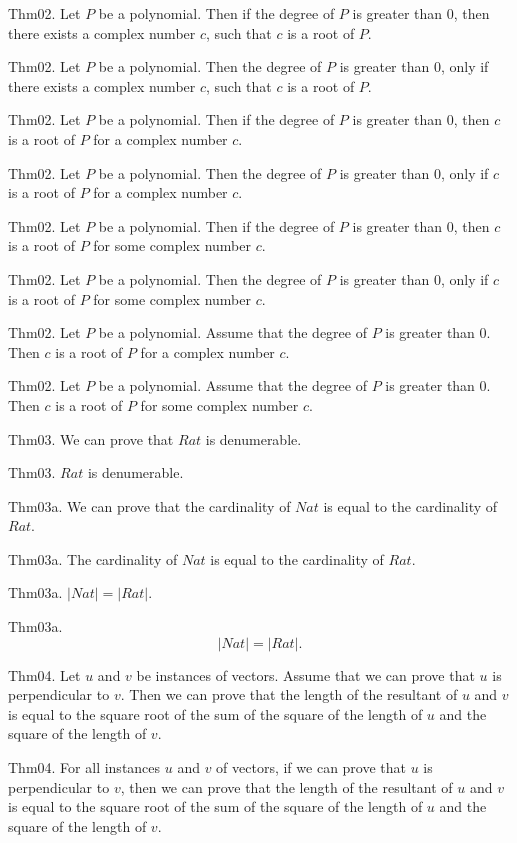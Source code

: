 \documentclass{article}
\begin{document}
Thm02. Let $P$ be a polynomial. Then if the degree of $P$ is greater than $0$, then there exists a complex number $c$, such that $c$ is a root of $P$.

Thm02. Let $P$ be a polynomial. Then the degree of $P$ is greater than $0$, only if there exists a complex number $c$, such that $c$ is a root of $P$.

Thm02. Let $P$ be a polynomial. Then if the degree of $P$ is greater than $0$, then $c$ is a root of $P$ for a complex number $c$.

Thm02. Let $P$ be a polynomial. Then the degree of $P$ is greater than $0$, only if $c$ is a root of $P$ for a complex number $c$.

Thm02. Let $P$ be a polynomial. Then if the degree of $P$ is greater than $0$, then $c$ is a root of $P$ for some complex number $c$.

Thm02. Let $P$ be a polynomial. Then the degree of $P$ is greater than $0$, only if $c$ is a root of $P$ for some complex number $c$.

Thm02. Let $P$ be a polynomial. Assume that the degree of $P$ is greater than $0$. Then $c$ is a root of $P$ for a complex number $c$.

Thm02. Let $P$ be a polynomial. Assume that the degree of $P$ is greater than $0$. Then $c$ is a root of $P$ for some complex number $c$.

Thm03. We can prove that $Rat$ is denumerable.

Thm03. $Rat$ is denumerable.

Thm03a. We can prove that the cardinality of $Nat$ is equal to the cardinality of $Rat$.

Thm03a. The cardinality of $Nat$ is equal to the cardinality of $Rat$.

Thm03a. $| Nat | = | Rat |$.

Thm03a. $$| Nat | = | Rat |.$$

Thm04. Let $u$ and $v$ be instances of vectors. Assume that we can prove that $u$ is perpendicular to $v$. Then we can prove that the length of the resultant of $u$ and $v$ is equal to the square root of the sum of the square of the length of $u$ and the square of the length of $v$.

Thm04. For all instances $u$ and $v$ of vectors, if we can prove that $u$ is perpendicular to $v$, then we can prove that the length of the resultant of $u$ and $v$ is equal to the square root of the sum of the square of the length of $u$ and the square of the length of $v$.
\end{document}
